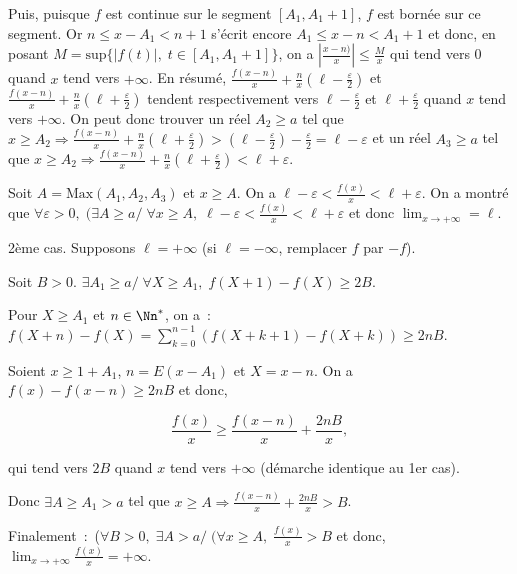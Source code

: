 {{Puis, puisque $f$ est continue sur le segment $[A_1,A_1+1]$, $f$ est bornée sur ce segment. Or $n\leq x-A_1<n+1$ s'écrit encore $A_1\leq x-n <A_1+1$ et donc, en posant $M=\mbox{sup}\{|f(t)|,\;t\in[A_1,A_1+1]\}$, on a $\left|\frac{x-n)}{x}\right|\leq\frac{M}{x}$ qui tend vers $0$ quand $x$ tend vers $+\infty$. En résumé, $\frac{f(x-n)}{x}+\frac{n}{x}(\ell-\frac{\varepsilon}{2})$ et $\frac{f(x-n)}{x}+\frac{n}{x}(\ell+\frac{\varepsilon}{2})$ tendent respectivement vers $\ell-\frac{\varepsilon}{2}$ et $\ell+\frac{\varepsilon}{2}$ quand $x$ tend vers $+\infty$. On peut donc trouver un réel $A_2\geq a$ tel que $x\geq A_2\Rightarrow\frac{f(x-n)}{x}+\frac{n}{x}(\ell+\frac{\varepsilon}{2})>(\ell-\frac{\varepsilon}{2})-\frac{\varepsilon}{2}=\ell-\varepsilon$ et un réel $A_3\geq a$ tel que $x\geq A_2\Rightarrow\frac{f(x-n)}{x}+\frac{n}{x}(\ell+\frac{\varepsilon}{2})<\ell+\varepsilon$.

Soit $A=\mbox{Max}(A_1,A_2,A_3)$ et $x\geq A$. On a $\ell-\varepsilon<\frac{f(x)}{x}<\ell+\varepsilon$. On a montré que $\forall\varepsilon>0,\;(\exists A\geq a/\;\forall x\geq A,\;\ell-\varepsilon<\frac{f(x)}{x}<\ell+\varepsilon$ et donc $\lim_{x\rightarrow +\infty}=\ell$.

2ème cas. Supposons $\ell=+\infty$ (si $\ell=-\infty$, remplacer $f$ par $-f$).

Soit $B>0$. $\exists A_1\geq a/\;\forall X\geq A_1,\;f(X+1)-f(X)\geq 2B$.

Pour $X\geq A_1$ et $n\in\Nn^*$, on a~:~$f(X+n)-f(X)=\sum_{k=0}^{n-1}(f(X+k+1)-f(X+k))\geq2nB$.

Soient $x\geq1+A_1$, $n=E(x-A_1)$ et $X=x-n$. On a $f(x)-f(x-n)\geq2nB$ et donc,

$$\frac{f(x)}{x}\geq\frac{f(x-n)}{x}+\frac{2nB}{x},$$

qui tend vers $2B$ quand $x$ tend vers $+\infty$ (démarche identique au 1er cas).

Donc $\exists A\geq A_1>a$ tel que $x\geq A\Rightarrow\frac{f(x-n)}{x}+\frac{2nB}{x}>B$.

Finalement~:~($\forall B>0,\;\exists A>a/\;(\forall x\geq A,\;\frac{f(x)}{x}>B$ et donc, $\lim_{x\rightarrow +\infty}\frac{f(x)}{x}=+\infty$.
}
}

